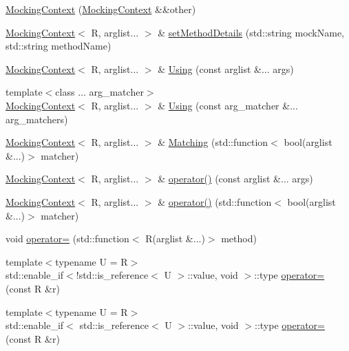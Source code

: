 \begin{DoxyCompactItemize}
\mbox{\hyperlink{classfakeit_1_1MockingContext_a4611ccb2f40b25362c40316ec87c0da5}{Mocking\+Context}} (\mbox{\hyperlink{classfakeit_1_1MockingContext}{Mocking\+Context}} \&\&other)
\item 
\mbox{\hyperlink{classfakeit_1_1MockingContext}{Mocking\+Context}}$<$ R, arglist... $>$ \& \mbox{\hyperlink{classfakeit_1_1MockingContext_a07958a59915dcc84633818a9644e1921}{set\+Method\+Details}} (std\+::string mock\+Name, std\+::string method\+Name)
\item 
\mbox{\hyperlink{classfakeit_1_1MockingContext}{Mocking\+Context}}$<$ R, arglist... $>$ \& \mbox{\hyperlink{classfakeit_1_1MockingContext_ade706bb68e9ffb128fad353a3b15758b}{Using}} (const arglist \&... args)
\item 
{\footnotesize template$<$class ... arg\+\_\+matcher$>$ }\\\mbox{\hyperlink{classfakeit_1_1MockingContext}{Mocking\+Context}}$<$ R, arglist... $>$ \& \mbox{\hyperlink{classfakeit_1_1MockingContext_acb9bd9b011ac2ad88c8d08eebfa101ac}{Using}} (const arg\+\_\+matcher \&... arg\+\_\+matchers)
\item 
\mbox{\hyperlink{classfakeit_1_1MockingContext}{Mocking\+Context}}$<$ R, arglist... $>$ \& \mbox{\hyperlink{classfakeit_1_1MockingContext_a631dd9877017e082b2e1191b02f4c17a}{Matching}} (std\+::function$<$ bool(arglist \&...)$>$ matcher)
\item 
\mbox{\hyperlink{classfakeit_1_1MockingContext}{Mocking\+Context}}$<$ R, arglist... $>$ \& \mbox{\hyperlink{classfakeit_1_1MockingContext_a70a55886680449fa36e8f5869af93389}{operator()}} (const arglist \&... args)
\item 
\mbox{\hyperlink{classfakeit_1_1MockingContext}{Mocking\+Context}}$<$ R, arglist... $>$ \& \mbox{\hyperlink{classfakeit_1_1MockingContext_aff3a6b6107f5bc4e028e75bf9b55f313}{operator()}} (std\+::function$<$ bool(arglist \&...)$>$ matcher)
\item 
void \mbox{\hyperlink{classfakeit_1_1MockingContext_aadefb2bd6c1dee1f3aa8902277dd3fc2}{operator=}} (std\+::function$<$ R(arglist \&...)$>$ method)
\item 
{\footnotesize template$<$typename U  = R$>$ }\\std\+::enable\+\_\+if$<$!std\+::is\+\_\+reference$<$ U $>$\+::value, void $>$\+::type \mbox{\hyperlink{classfakeit_1_1MockingContext_adfac3df2408adaa86efec81bd5533a6d}{operator=}} (const R \&r)
\item 
{\footnotesize template$<$typename U  = R$>$ }\\std\+::enable\+\_\+if$<$ std\+::is\+\_\+reference$<$ U $>$\+::value, void $>$\+::type \mbox{\hyperlink{classfakeit_1_1MockingContext_ad5e903b223858dbe67f1da1523ef0d60}{operator=}} (const R \&r)

\end{DoxyCompactItemize}
